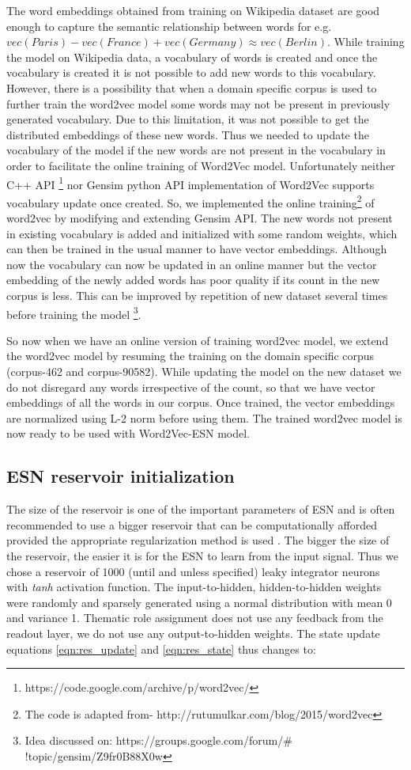The word embeddings obtained from training on Wikipedia dataset are good enough to capture the semantic relationship between words for e.g. $vec(Paris) -vec(France) + vec(Germany) \approx vec(Berlin)$. While training the model on Wikipedia data, a vocabulary of words is created and once the vocabulary is created it is not possible to add new words to this vocabulary. However, there is a possibility that when a domain specific corpus is used to further train the word2vec model some words may not be present in previously generated vocabulary. Due to this limitation, it was not possible to get the distributed embeddings of these new words. Thus we needed to update the vocabulary of the model if the new words are not present in the vocabulary in order to facilitate the online training of Word2Vec model. Unfortunately neither C++ API \footnote{https://code.google.com/archive/p/word2vec/} nor Gensim python API \cite{w2v:gensim_api} implementation of Word2Vec supports vocabulary update once created. So, we implemented the online training\footnote{The code is adapted from-  http://rutumulkar.com/blog/2015/word2vec} of word2vec by modifying and extending Gensim API. The new words not present in existing vocabulary is added and initialized with some random weights, which can then be trained in the usual manner to have vector embeddings. Although now the vocabulary can now be updated in an online manner but the vector embedding of the newly added words has poor quality if its count in the new corpus is less. This can be improved by repetition of new dataset several times before training the model \footnote{Idea discussed on: https://groups.google.com/forum/$\#$!topic/gensim/Z9fr0B88X0w}.

So now when we have an online version of training word2vec model, we extend the word2vec model by resuming the training on the domain specific corpus (corpus-462 and corpus-90582). While updating the model on the new dataset we do not disregard any words irrespective of the count, so that we have vector embeddings of all the words in our corpus. Once trained, the vector embeddings are normalized using L-2 norm before using them. The trained word2vec model is now ready to be used with Word2Vec-ESN model.

\subsection{ESN reservoir initialization}

The size of the reservoir is one of the important parameters of ESN and is often recommended to use a bigger reservoir that can be computationally afforded provided the appropriate regularization method is used \cite{esn:practical_guide}. The bigger the size of the reservoir, the easier it is for the ESN to learn from the input signal. Thus we chose a reservoir of 1000 (until and unless specified) leaky integrator neurons with \textit{tanh} activation function. The input-to-hidden, hidden-to-hidden weights were randomly and sparsely generated using a normal distribution with mean 0 and variance 1. Thematic role assignment does not use any feedback from the readout layer, we do not use any output-to-hidden weights. The state update equations \ref{eqn:res_update} and \ref{eqn:res_state} thus changes to:

